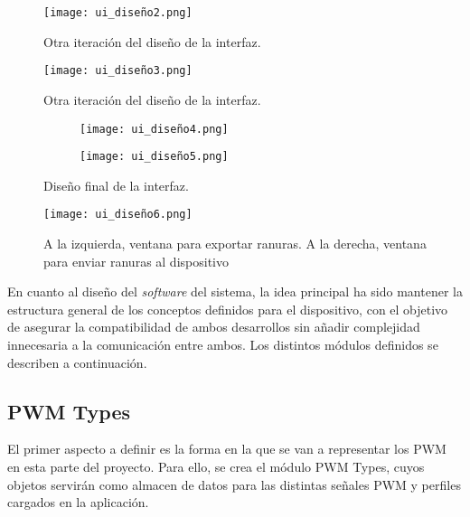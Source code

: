 \begin{figure}[h!]
    \centering
    \texttt{[image: ui\_diseño2.png]}
    \caption{Otra iteración del diseño de la interfaz.}
    \label{fig:ui_diseño2}
\end{figure}

\begin{figure}[h!]
    \centering
    \texttt{[image: ui\_diseño3.png]}
    \caption{Otra iteración del diseño de la interfaz.}
    \label{fig:ui_diseño3}
\end{figure}


\begin{figure}[h!]
    \centering
    \begin{subfigure}{0.95\textwidth}
        \texttt{[image: ui\_diseño4.png]}
    \end{subfigure}
    \vfill
    \begin{subfigure}{0.95\textwidth}
        \texttt{[image: ui\_diseño5.png]}
    \end{subfigure}
    \caption{Diseño final de la interfaz.}
\end{figure}
\label{fig:ui_diseño_final1}

\begin{figure}[h!]
    \centering
    \texttt{[image: ui\_diseño6.png]}
    \caption{A la izquierda, ventana para exportar ranuras. A la derecha, ventana para enviar ranuras al dispositivo}
    \label{fig:ui_diseño_final2}
\end{figure}

\FloatBarrier

En cuanto al diseño del \textit{software} del sistema, la idea principal ha sido mantener la estructura general de los conceptos definidos para el dispositivo, con el objetivo de asegurar la compatibilidad de ambos desarrollos sin añadir complejidad innecesaria a la comunicación entre ambos. Los distintos módulos definidos se describen a continuación.

\subsection{PWM Types}

El primer aspecto a definir es la forma en la que se van a representar los PWM en esta parte del proyecto. Para ello, se crea el módulo PWM Types, cuyos objetos servirán como almacen de datos para las distintas señales PWM y perfiles cargados en la aplicación.

